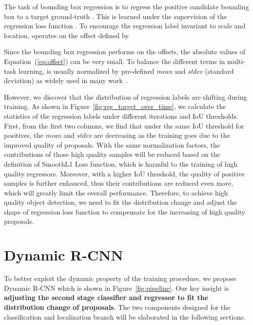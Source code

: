\documentclass[runningheads]{llncs}
\begin{document}
The task of bounding box regression is to regress the positive candidate bounding box  to a target ground-truth . This is learned under the supervision of the regression loss function . To encourage the regression label invariant to scale and location,  operates on the offset  defined by



Since the bounding box regression performs on the offsets, the absolute values of Equation~(\ref{eq:offset}) can be very small. To balance the different terms in multi-task learning,  is usually normalized by pre-defined \textit{mean} and \textit{stdev} (standard deviation) as widely used in many work~\cite{FasterRCNN,FPN,MaskRCNN}.

However, we discover that the distribution of regression labels are shifting during training. As shown in Figure~\ref{fig:reg_target_over_time}, we calculate the statistics of the regression labels under different iterations and IoU thresholds. First, from the first two columns, we find that under the same IoU threshold for positives, the \textit{mean} and \textit{stdev} are decreasing as the training goes due to the improved quality of proposals. With the same normalization factors, the contributions of those high quality samples will be reduced based on the definition of SmoothL1 Loss function, which is harmful to the training of high quality regressors.
Moreover, with a higher IoU threshold, the quality of positive samples is further enhanced, thus their contributions are reduced even more, which will greatly limit the overall performance.
Therefore, to achieve high quality object detection, we need to fit the distribution change and adjust the shape of regression loss function to compensate for the increasing of high quality proposals.


\section{Dynamic R-CNN}
\label{sec:dynamic_rcnn}

To better exploit the dynamic property of the training procedure, we propose Dynamic R-CNN which is shown in Figure~\ref{fig:pipeline}. Our key insight is \textbf{adjusting the second stage classifier and regressor to fit the distribution change of proposals}. The two components designed for the classification and localization branch will be elaborated in the following sections.
\end{document}
